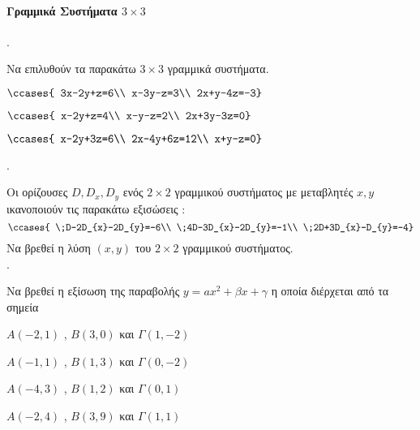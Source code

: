 \documentclass[11pt,a4paper,twocolumn]{article}
\newcounter{askhsh}
\newcommand{\askhsh}{\large\theaskhsh.\ \addtocounter{askhsh}{1}}
\begin{document}
\paragraph{Γραμμικά Συστήματα $ 3\times3$}
\askhsh Να επιλυθούν τα παρακάτω $ 3\times3 $ γραμμικά συστήματα.
\begin{multicols}{2}
\begin{alist}
\item $\ccases{
3x-2y+z=6\\
x-3y-z=3\\
2x+y-4z=-3}$
\item $\ccases{
x-2y+z=4\\
x-y-z=2\\
2x+3y-3z=0}$
\item $\ccases{
x-2y+3z=6\\
2x-4y+6z=12\\
x+y-z=0}$
\end{alist}\end{multicols}
\askhsh Οι ορίζουσες $ D,D_x,D_y $ ενός $ 2\times2 $ γραμμικού συστήματος με μεταβλητές $ x,y $ ικανοποιούν τις παρακάτω εξισώσεις :
\[ \ccases{
\;D-2D_{x}-2D_{y}=-6\\
\;4D-3D_{x}-2D_{y}=-1\\
\;2D+3D_{x}-D_{y}=-4} \]
Να βρεθεί η λύση $ (x,y) $ του $ 2\times2 $ γραμμικού συστήματος.\\
\askhsh Να βρεθεί η εξίσωση της παραβολής $ y=ax^2+\beta x+\gamma $ η οποία διέρχεται από τα σημεία
\begin{alist}
\item $ A(-2,1) $ , $ B(3,0) $ και $ \varGamma(1,-2) $
\item $ A(-1,1) $ , $ B(1,3) $ και $ \varGamma(0,-2) $
\item $ A(-4,3) $ , $ B(1,2) $ και $ \varGamma(0,1) $
\item $ A(-2,4) $ , $ B(3,9) $ και $ \varGamma(1,1) $
\end{alist}
\end{document}
